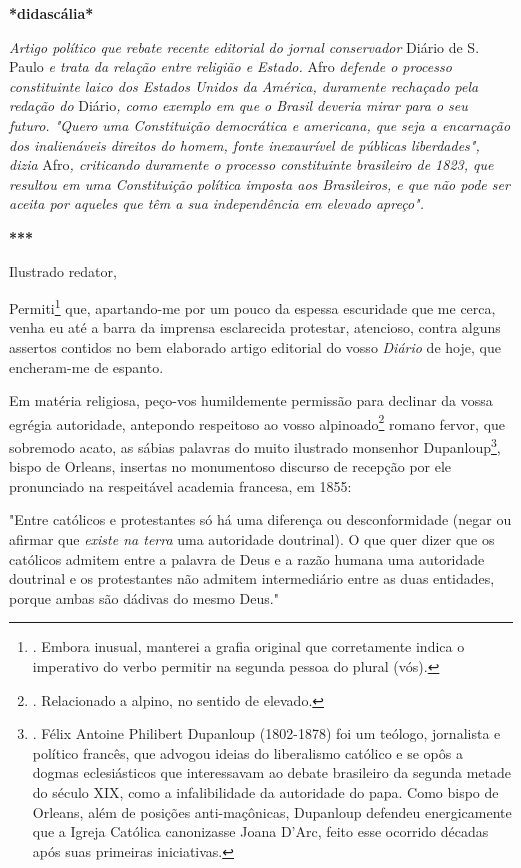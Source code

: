 \textbf{*didascália*}

\emph{Artigo político que rebate recente editorial do jornal
conservador} Diário de S. Paulo \emph{e trata da relação entre religião
e Estado.} Afro \emph{defende o processo constituinte laico dos Estados
Unidos da América, duramente rechaçado pela redação do} Diário\emph{,
como exemplo em que o Brasil deveria mirar para o seu futuro. "Quero uma
Constituição democrática e americana, que seja a encarnação dos
inalienáveis direitos do homem, fonte inexaurível de públicas
liberdades", dizia} Afro\emph{, criticando duramente o processo
constituinte brasileiro de 1823, que resultou em uma Constituição
política imposta aos Brasileiros, e que não pode ser aceita por aqueles
que têm a sua independência em elevado apreço".}

\textbf{***}

Ilustrado redator,

Permiti\footnote{. Embora inusual, manterei a grafia original que
  corretamente indica o imperativo do verbo permitir na segunda pessoa
  do plural (vós).} que, apartando-me por um pouco da espessa escuridade
que me cerca, venha eu até a barra da imprensa esclarecida protestar,
atencioso, contra alguns assertos contidos no bem elaborado artigo
editorial do vosso \emph{Diário} de hoje, que encheram-me de espanto.

Em matéria religiosa, peço-vos humildemente permissão para declinar da
vossa egrégia autoridade, antepondo respeitoso ao vosso
alpinoado\footnote{. Relacionado a alpino, no sentido de elevado.}
romano fervor, que sobremodo acato, as sábias palavras do muito
ilustrado monsenhor Dupanloup\footnote{. Félix Antoine Philibert
  Dupanloup (1802-1878) foi um teólogo, jornalista e político francês,
  que advogou ideias do liberalismo católico e se opôs a dogmas
  eclesiásticos que interessavam ao debate brasileiro da segunda metade
  do século XIX, como a infalibilidade da autoridade do papa. Como bispo
  de Orleans, além de posições anti-maçônicas, Dupanloup defendeu
  energicamente que a Igreja Católica canonizasse Joana D'Arc, feito
  esse ocorrido décadas após suas primeiras iniciativas.}, bispo de
Orleans, insertas no monumentoso discurso de recepção por ele
pronunciado na respeitável academia francesa, em 1855:

"Entre católicos e protestantes só há uma diferença ou desconformidade
(negar ou afirmar que \emph{existe na terra} uma autoridade doutrinal).
O que quer dizer que os católicos admitem entre a palavra de Deus e a
razão humana uma autoridade doutrinal e os protestantes não admitem
intermediário entre as duas entidades, porque ambas são dádivas do mesmo
Deus."

